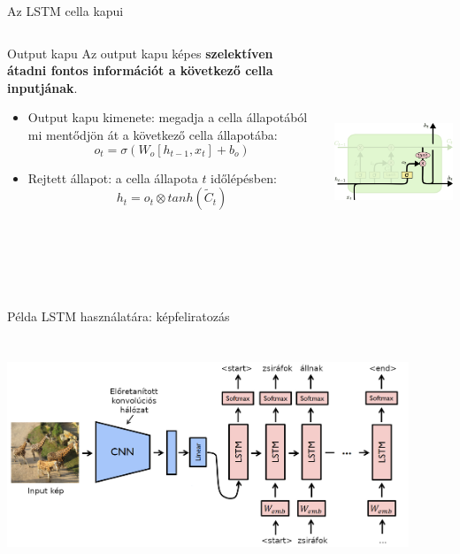 \documentclass[english, aspectratio=169]{beamer}
\begin{document}
\begin{frame}{Az LSTM cella kapui}
\begin{columns}
\begin{column}{.5\textwidth}
\begin{block}{Output kapu}
Az output kapu képes \textbf{szelektíven átadni fontos információt a következő cella inputjának}.
\begin{itemize}
	\item Output kapu kimenete: megadja a cella állapotából mi mentődjön át a következő cella állapotába:
	\[
	o_t = \sigma \left( W_o \left[ h_{t-1}, x_t \right] + b_o \right)
	\]
	\item Rejtett állapot: a cella állapota $t$ időlépésben:
	\[
	h_t = o_t \otimes tanh \left( \tilde{C}_t \right)
	\]
\end{itemize}
\end{block}
\end{column}
\begin{column}{.5\textwidth}
\begin{center}
\includegraphics[width=7cm, height=7cm, keepaspectratio]{images/recurrent_10.png}
\end{center}
\end{column}
\end{columns}
\end{frame}

\begin{frame}{Példa LSTM használatára: képfeliratozás}
\begin{center}
\includegraphics[width=12cm, height=7cm, keepaspectratio]{images/recurrent_13.png}
\end{center}
\end{frame}
\end{document}
